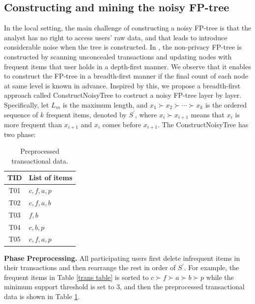 \documentclass[conference]{IEEEtran}
\begin{document}
\subsection{Constructing and mining the noisy FP-tree}
\label{construct and mine}
In the local setting, the main challenge of constructing a noisy FP-tree is that the analyst has no right to access users' raw data, and that leads to introduce considerable noise when the tree is constructed. In \cite{fp}, the non-privacy FP-tree is constructed by scanning unconcealed transactions and {\color{red}updating nodes with frequent items that user holds in a depth-first manner}. We observe that it enables to construct the FP-tree in a breadth-first manner if the final count of each node at same level is known in advance. Inspired by this, we propose a breadth-first approach {\color{red}called ConstructNoisyTree} to costruct a noisy FP-tree layer by layer. Specifically, let $L_m$ is the maximum length, and $x_1 \succ x_2 \succ \cdots  \succ x_k$ is the ordered sequence of $k$ frequent items, denoted by $S^{\prime}$, where $x_i \succ x_{i+1}$ means that $x_i$ is more frequent than $x_{i+1}$ and $x_i$ comes before $x_{i+1}$. The {\color{red} ConstructNoisyTree} has two phase:


\begin{table}[tb]
\caption{{\color{red}Preprocessed transactional data.}}
\label{preprocessed trans}
\centering
\begin{tabular}{|c|l|}\hline
  TID&List of items \\\hline
  T01&$c,f,a,p$ \\\hline
  T02&$c,f,a,b$ \\\hline
  T03&$f,b$ \\\hline
  T04&$c,b,p$ \\\hline
  T05&$c,f,a,p$ \\\hline
\end{tabular}
\end{table}

\textbf{Phase \uppercase\expandafter{} Preprocessing.} All participating users first delete infrequent items in their transactions and then rearrange the rest in order of $S^{\prime}$. For example, the frequent items in Table \ref{trans table} is sorted to $c\succ f\succ a\succ b\succ p$ while the minimum support threshold is set to 3, and then the preprocessed transactional data is shown in Table \ref{preprocessed trans}.
\end{document}
